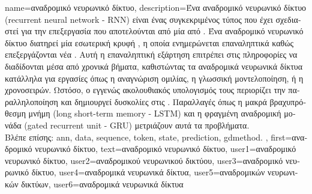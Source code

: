 {name={\foreignlanguage{greek}{αναδρομικό νευρωνικό δίκτυο}},
	description={\foreignlanguage{greek}{Ένα αναδρομικό νευρωνικό δίκτυο} (recurrent neural network - RNN) 
		\foreignlanguage{greek}{είναι ένας συγκεκριμένος τύπος}  \foreignlanguage{greek}{που έχει σχεδιαστεί για την 
		επεξεργασία}  \foreignlanguage{greek}{που αποτελούνται από μία}  \foreignlanguage{greek}{από}
		. \foreignlanguage{greek}{Ένα αναδρομικό νευρωνικό δίκτυο διατηρεί μία εσωτερική κρυφή} ,
		\foreignlanguage{greek}{η οποία ενημερώνεται επαναληπτικά καθώς επεξεργάζονται νέα} . 
		\foreignlanguage{greek}{Αυτή η επαναληπτική εξάρτηση επιτρέπει στις πληροφορίες να διαδίδονται μέσα από χρονικά βήματα,
		καθιστώντας τα αναδρομικά νευρωνικά δίκτυα κατάλληλα για εργασίες όπως η αναγνώριση ομιλίας, η γλωσσική μοντελοποίηση, 
		ή η}  \foreignlanguage{greek}{χρονοσειρών. Ωστόσο, ο εγγενώς ακολουθιακός υπολογισμός τους περιορίζει 
		την παραλληλοποίηση και δημιουργεί δυσκολίες στις} . \foreignlanguage{greek}{Παραλλαγές όπως η 
		μακρά βραχυπρόθεσμη μνήμη} (long short-term memory - LSTM) \foreignlanguage{greek}{και η φραγμένη αναδρομική μονάδα} 
		(gated recurrent unit - GRU) \foreignlanguage{greek}{μετριάζουν αυτά τα προβλήματα.} 
		\\
		\foreignlanguage{greek}{Βλέπε επίσης:} \gls{ann}, \gls{data}, \gls{sequence}, \gls{token}, \gls{state}, \gls{prediction}, \gls{gdmethod}. }, 
 	first={\foreignlanguage{greek}{αναδρομικό νευρωνικό δίκτυο}},
 	text={\foreignlanguage{greek}{αναδρομικό νευρωνικό δίκτυο}},
	user1={\foreignlanguage{greek}{αναδρομικό νευρωνικό δίκτυο}}, %
	user2={\foreignlanguage{greek}{αναδρομικού νευρωνικού δικτύου}}, %
	user3={\foreignlanguage{greek}{αναδρομικό νευρωνικό δίκτυο}}, %
	user4={\foreignlanguage{greek}{αναδρομικά νευρωνικά δίκτυα}}, %
	user5={\foreignlanguage{greek}{αναδρομικών νευρωνικών δικτύων}}, %
	user6={\foreignlanguage{greek}{αναδρομικά νευρωνικά δίκτυα}} %
}%

